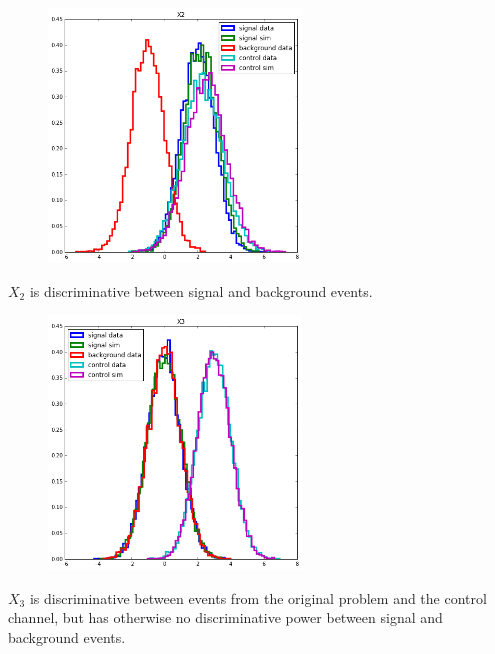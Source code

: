 \documentclass{beamer}
\begin{document}
\begin{frame}

\begin{figure}
\centering
\includegraphics[width=0.6\textwidth]{x2.png}
\end{figure}

$X_2$ is discriminative between signal and background events.

\end{frame}

\begin{frame}

\begin{figure}
\centering
\includegraphics[width=0.6\textwidth]{x3.png}
\end{figure}

$X_3$ is discriminative between events from the original problem and the
control channel, but has otherwise no discriminative power between signal and
background events.

\end{frame}
\end{document}
